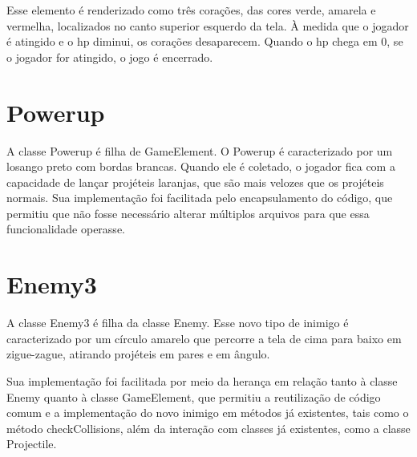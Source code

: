 \documentclass[
	12pt,				%
	oneside,			%
	a4paper,			%
	english,			%
	brazil				%
	]{abntex2ppgsi}
\begin{document}
Esse elemento é renderizado como três corações, das cores verde, amarela e vermelha, localizados no canto superior esquerdo da tela. À medida que o jogador é atingido e o hp diminui, os corações desaparecem. Quando o hp chega em 0, se o jogador for atingido, o jogo é encerrado.

\section{Powerup}

A classe Powerup é filha de GameElement. O Powerup é caracterizado por um losango preto com bordas brancas. Quando ele é coletado, o jogador fica com a capacidade de lançar projéteis laranjas, que são mais velozes que os projéteis normais. Sua implementação foi facilitada pelo encapsulamento do código, que permitiu que não fosse necessário alterar múltiplos arquivos para que essa funcionalidade operasse.

\section{Enemy3}

A classe Enemy3 é filha da classe Enemy. Esse novo tipo de inimigo é caracterizado por um círculo amarelo que percorre a tela de cima para baixo em zigue-zague, atirando projéteis em pares e em ângulo.

Sua implementação foi facilitada por meio da herança em relação tanto à classe Enemy quanto à classe GameElement, que permitiu a reutilização de código comum e a implementação do novo inimigo em métodos já existentes, tais como o método checkCollisions, além da interação com classes já existentes, como a classe Projectile. 

\postextual

\end{document}
